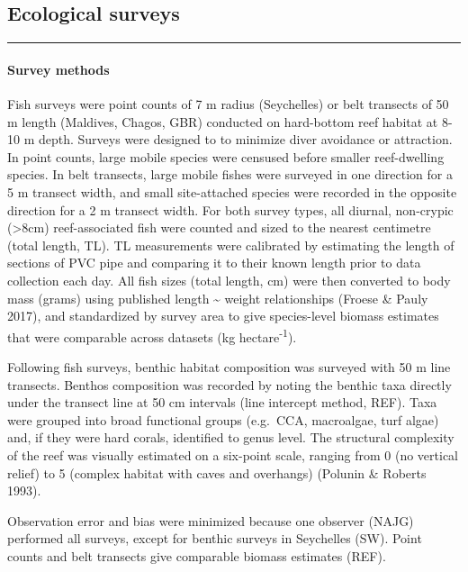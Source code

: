\documentclass[]{article}
\title{}
\author{}
\date{}
\let\oldparagraph\paragraph
\renewcommand{\paragraph}[1]{\oldparagraph{#1}\mbox{}}
\begin{document}
\subsection{Ecological surveys}\label{ecological-surveys}

\begin{center}\rule{0.5\linewidth}{\linethickness}\end{center}

\paragraph{Survey methods}\label{survey-methods}

Fish surveys were point counts of 7 m radius (Seychelles) or belt
transects of 50 m length (Maldives, Chagos, GBR) conducted on
hard-bottom reef habitat at 8-10 m depth. Surveys were designed to to
minimize diver avoidance or attraction. In point counts, large mobile
species were censused before smaller reef-dwelling species. In belt
transects, large mobile fishes were surveyed in one direction for a 5 m
transect width, and small site-attached species were recorded in the
opposite direction for a 2 m transect width. For both survey types, all
diurnal, non-crypic (\textgreater{}8cm) reef-associated fish were
counted and sized to the nearest centimetre (total length, TL). TL
measurements were calibrated by estimating the length of sections of PVC
pipe and comparing it to their known length prior to data collection
each day. All fish sizes (total length, cm) were then converted to body
mass (grams) using published length \textasciitilde{} weight
relationships (Froese \& Pauly 2017), and standardized by survey area to
give species-level biomass estimates that were comparable across
datasets (kg hectare\textsuperscript{-1}).

Following fish surveys, benthic habitat composition was surveyed with 50
m line transects. Benthos composition was recorded by noting the benthic
taxa directly under the transect line at 50 cm intervals (line intercept
method, REF). Taxa were grouped into broad functional groups (e.g.~CCA,
macroalgae, turf algae) and, if they were hard corals, identified to
genus level. The structural complexity of the reef was visually
estimated on a six-point scale, ranging from 0 (no vertical relief) to 5
(complex habitat with caves and overhangs) (Polunin \& Roberts 1993).

Observation error and bias were minimized because one observer (NAJG)
performed all surveys, except for benthic surveys in Seychelles (SW).
Point counts and belt transects give comparable biomass estimates (REF).
\end{document}
